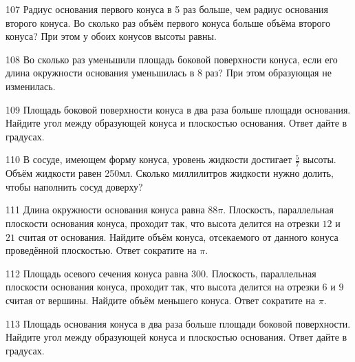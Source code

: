 \documentclass[a4paper]{article}
\begin{document}
\begin{taskBN}{107}
Радиус основания первого конуса в 5 раз больше, чем радиус основания второго конуса. Во сколько раз объём первого конуса больше объёма второго конуса? При этом у обоих конусов высоты равны.
\end{taskBN}

\begin{taskBN}{108}
Во сколько раз уменьшили площадь боковой поверхности конуса, если его длина окружности основания уменьшилась в 8 раз? При этом образующая не изменилась.
\end{taskBN}

\begin{taskBN}{109}
Площадь боковой поверхности конуса в два раза больше площади основания. Найдите угол между образующей конуса и плоскостью основания. Ответ дайте в градусах.
\end{taskBN}

\begin{taskBN}{110}
В сосуде, имеющем форму конуса, уровень жидкости достигает $\frac{5}{7}$ высоты. Объём жидкости равен 250мл. Сколько миллилитров жидкости нужно долить, чтобы наполнить сосуд доверху?
\end{taskBN}

\begin{taskBN}{111}
Длина окружности основания конуса равна $88\pi$. Плоскость, параллельная плоскости основания конуса,  проходит так, что высота делится на отрезки $12$ и $21$ считая от основания. Найдите объём конуса, отсекаемого от данного конуса проведённой плоскостью. Ответ сократите на $\pi$.
\end{taskBN}

\begin{taskBN}{112}
Площадь осевого сечения конуса равна $300$. Плоскость, параллельная плоскости основания конуса,  проходит так, что высота делится на отрезки $6$ и $9$ считая от вершины. Найдите объём меньшего конуса. Ответ сократите на $\pi$.
\end{taskBN}

\begin{taskBN}{113}
Площадь основания конуса в два раза больше площади боковой поверхности. Найдите угол между образующей конуса и плоскостью основания. Ответ дайте в градусах.
\end{taskBN}
\end{document}
